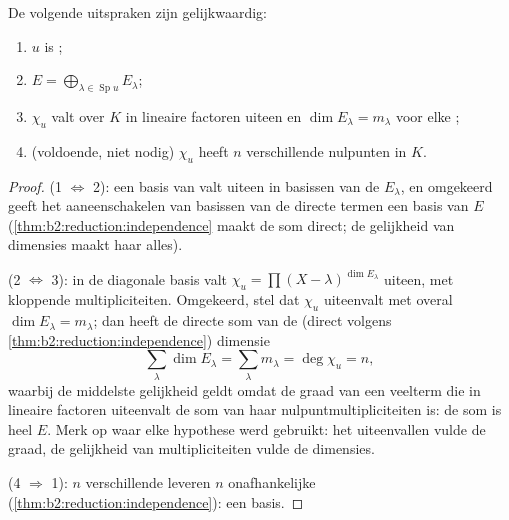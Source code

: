 \begin{theorem}\label{thm:b2:reduction:diagcrit}
De volgende uitspraken zijn gelijkwaardig:
\begin{enumerate}
  \item $u$ is ;
  \item $E = \bigoplus_{\lambda \in \operatorname{Sp} u} E_\lambda$;
  \item $\chi_u$ valt over $K$ in lineaire factoren uiteen en $\dim
        E_\lambda = m_\lambda$ voor elke ;
  \item (voldoende, niet nodig) $\chi_u$ heeft $n$ verschillende
        nulpunten in $K$.
\end{enumerate}
\end{theorem}

\begin{proof}
(1 $\iff$ 2): een basis van  valt uiteen in basissen
van de $E_\lambda$, en omgekeerd geeft het aaneenschakelen van
basissen van de directe termen een basis van $E$
(\cref{thm:b2:reduction:independence} maakt de som direct; de
gelijkheid van dimensies maakt haar alles).

(2 $\iff$ 3): in de diagonale basis valt $\chi_u = \prod (X -
\lambda)^{\dim E_\lambda}$ uiteen, met kloppende multipliciteiten.
Omgekeerd, stel dat $\chi_u$ uiteenvalt met overal $\dim E_\lambda
= m_\lambda$; dan heeft de directe som van de  (direct
volgens \cref{thm:b2:reduction:independence}) dimensie
\[
\sum_{\lambda}\dim E_\lambda = \sum_{\lambda} m_\lambda =
\deg\chi_u = n ,
\]
waarbij de middelste gelijkheid geldt omdat de graad van een
veelterm die in lineaire factoren uiteenvalt de som van haar
nulpuntmultipliciteiten is: de som is heel $E$. Merk op waar elke
hypothese werd gebruikt: het uiteenvallen vulde de graad, de
gelijkheid van multipliciteiten vulde de dimensies.

(4 $\Rightarrow$ 1): $n$ verschillende  leveren $n$
onafhankelijke 
(\cref{thm:b2:reduction:independence}): een basis.
\end{proof}

